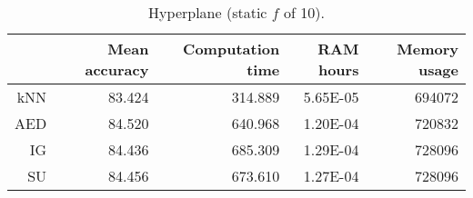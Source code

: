 \begin{table}[h]
\centering
\begin{tabular}{r|rrrr}
    & Mean accuracy & Computation time & RAM hours & Memory usage \\ \hline
kNN & 83.424                   & 314.889          & 5.65E-05  & 694072       \\
AED & 84.520                   & 640.968          & 1.20E-04  & 720832       \\
IG  & 84.436                   & 685.309          & 1.29E-04  & 728096       \\
SU  & 84.456                   & 673.610          & 1.27E-04  & 728096      
\end{tabular}
\caption{Hyperplane (static $f$ of 10).}
\label{Table:Hyperplane}
\end{table}